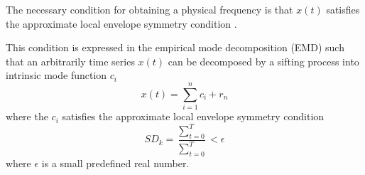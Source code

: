 \documentclass[11pt, oneside]{article}   	%
\begin{document}
\begin{flushleft}
 The necessary condition for obtaining a physical frequency is that $x(t)$ satisfies the approximate local envelope symmetry condition \cite{norden1998}. 



This condition 
is expressed in the empirical mode decomposition (EMD) such that an arbitrarily time series $x(t)$ can be decomposed by a sifting process into intrinsic mode function $c_{i}$
\begin{equation}
x(t) = \sum_{i=1}^{n}c_{i} + r_{n}
\end{equation}
where the $c_{i}$ satisfies the approximate local envelope symmetry condition
\begin{equation}
SD_{k} = \frac{\sum_{t=0}^{T}}{\sum_{t=0}^{T}} < \epsilon
\end{equation}
where $\epsilon$ is a small predefined real number.
\end{flushleft}
\end{document}
